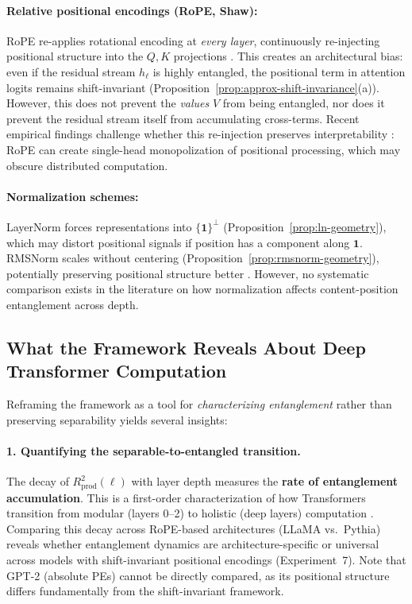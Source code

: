 \documentclass[11pt]{article}
\theoremstyle{definition}
\begin{document}
\paragraph{Relative positional encodings (RoPE, Shaw):}
RoPE re-applies rotational encoding at \emph{every layer}, continuously re-injecting positional structure into the $Q,K$ projections \cite{su2021roformer}. This creates an architectural bias: even if the residual stream $h_\ell$ is highly entangled, the positional term in attention logits remains shift-invariant (Proposition~\ref{prop:approx-shift-invariance}(a)). However, this does not prevent the \emph{values} $V$ from being entangled, nor does it prevent the residual stream itself from accumulating cross-terms. Recent empirical findings challenge whether this re-injection preserves interpretability \cite{peng2024rope,unpacking2025spectral}: RoPE can create single-head monopolization of positional processing, which may obscure distributed computation.

\paragraph{Normalization schemes:}
LayerNorm forces representations into $\{\mathbf{1}\}^\perp$ (Proposition~\ref{prop:ln-geometry}), which may distort positional signals if position has a component along $\mathbf{1}$. RMSNorm scales without centering (Proposition~\ref{prop:rmsnorm-geometry}), potentially preserving positional structure better \cite{zhang2019rmsnorm}. However, no systematic comparison exists in the literature on how normalization affects content-position entanglement across depth.

\subsection{What the Framework Reveals About Deep Transformer Computation}

Reframing the framework as a tool for \emph{characterizing entanglement} rather than preserving separability yields several insights:

\paragraph{1. Quantifying the separable-to-entangled transition.}
The decay of $R^2_{\text{prod}}(\ell)$ with layer depth measures the \textbf{rate of entanglement accumulation}. This is a first-order characterization of how Transformers transition from modular (layers 0--2) to holistic (deep layers) computation \cite{raghu2021vit,clark2019analyzing}. Comparing this decay across RoPE-based architectures (LLaMA vs.\ Pythia) reveals whether entanglement dynamics are architecture-specific or universal across models with shift-invariant positional encodings (Experiment~7). Note that GPT-2 (absolute PEs) cannot be directly compared, as its positional structure differs fundamentally from the shift-invariant framework.
\end{document}
